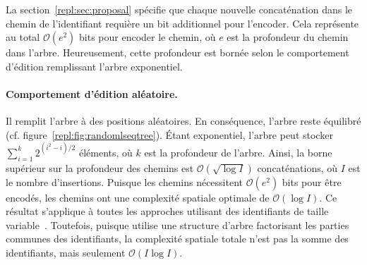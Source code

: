La section~\ref{repl:sec:proposal} spécifie que chaque nouvelle concaténation
dans le chemin de l'identifiant requière un bit additionnel pour l'encoder. Cela
représente au total $\mathcal{O}(e^2)$ bits pour encoder le chemin, où $e$ est
la profondeur du chemin dans l'arbre. Heureusement, cette profondeur est bornée
selon le comportement d'édition remplissant l'arbre exponentiel. 


\begin{figure}
  \begin{center}
    \hspace{10pt}
    \hspace{10pt}
  \end{center}
\end{figure}


\paragraph{Comportement d'édition aléatoire. } Il remplit l'arbre à des
positions aléatoires. En conséquence, l'arbre reste équilibré
(cf. figure~\ref{repl:fig:randomlseqtree}). Étant exponentiel, l'arbre peut
stocker $\textstyle\sum\nolimits_{i=1}^{k}{2^{(i^2-i)/2}}$ éléments, où $k$ est
la profondeur de l'arbre. Ainsi, la borne supérieur sur la profondeur des
chemins est $\mathcal{O}(\sqrt{\log I})$ concaténations, où $I$ est le nombre
d'insertions. Puisque les chemins nécessitent $\mathcal{O}(e^2)$ bits pour être
encodés, les chemins ont une complexité spatiale optimale de
$\mathcal{O}(\log I)$. Ce résultat s'applique à toutes les approches utilisant
des identifiants de taille variable~\cite{preguica2009commutative,
  weiss2009logoot}. Toutefois, puisque \LSEQ utilise une structure d'arbre
factorisant les parties communes des identifiants, la complexité spatiale totale
n'est pas la somme des identifiants, mais seulement $\mathcal{O}(I\log I)$.

